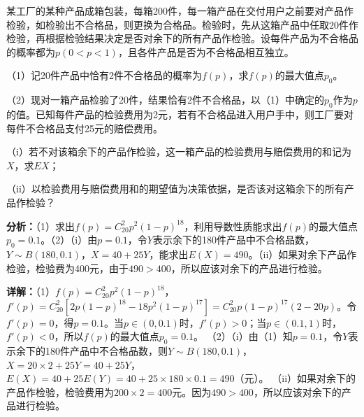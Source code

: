 \begin{question}[points=12]
某工厂的某种产品成箱包装，每箱200件，每一箱产品在交付用户之前要对产品作检验，如检验出不合格品，则更换为合格品。检验时，先从这箱产品中任取20件作检验，再根据检验结果决定是否对余下的所有产品作检验。设每件产品为不合格品的概率都为$p(0<p<1)$，且各件产品是否为不合格品相互独立。

（1）记20件产品中恰有2件不合格品的概率为$f(p)$，求$f(p)$的最大值点$p_0$。

（2）现对一箱产品检验了20件，结果恰有2件不合格品，以（1）中确定的$p_0$作为$p$的值。已知每件产品的检验费用为2元，若有不合格品进入用户手中，则工厂要对每件不合格品支付25元的赔偿费用。

（i）若不对该箱余下的产品作检验，这一箱产品的检验费用与赔偿费用的和记为$X$，求$EX$；

（ii）以检验费用与赔偿费用和的期望值为决策依据，是否该对这箱余下的所有产品作检验？
\begin{solution}

\textbf{分析：}（1）求出$f(p)=C_{20}^2p^2(1-p)^{18}$，利用导数性质能求出$f(p)$的最大值点$p_0=0.1$。（2）（i）由$p=0.1$，令$Y$表示余下的180件产品中不合格品数，$Y\sim B(180,0.1)$，$X=40+25Y$，能求出$E(X)=490$。（ii）如果对余下产品作检验，检验费为400元，由于$490>400$，所以应该对余下的产品进行检验。

\textbf{详解：}（1）$f(p)=C_{20}^2p^2(1-p)^{18}$，$f'(p)=C_{20}^2[2p(1-p)^{18}-18p^2(1-p)^{17}]=C_{20}^2p(1-p)^{17}(2-20p)$。令$f'(p)=0$，得$p=0.1$。当$p\in(0,0.1)$时，$f'(p)>0$；当$p\in(0.1,1)$时，$f'(p)<0$，所以$f(p)$的最大值点$p_0=0.1$。
（2）（i）由（1）知$p=0.1$，令$Y$表示余下的180件产品中不合格品数，则$Y\sim B(180,0.1)$，$X=20\times2+25Y=40+25Y$，$E(X)=40+25E(Y)=40+25\times180\times0.1=490$（元）。
（ii）如果对余下的产品作检验，检验费用为$200\times2=400$元。因为$490>400$，所以应该对余下的产品进行检验。
\end{solution}
\end{question}

